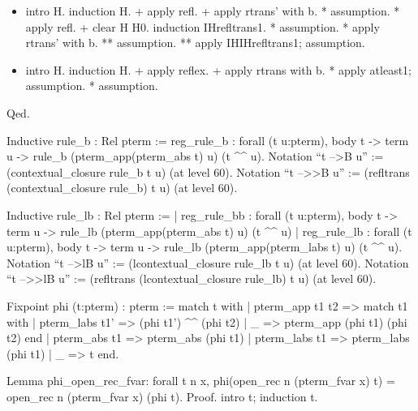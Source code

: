 \begin{itemize}
\item  intro H.
    induction H.
    + apply refl.
    + apply rtrans' with b.
      * assumption.
      * apply refl.
    + clear H H0.
      induction IHrefltrans1.
      * assumption.
      * apply rtrans' with b.
        ** assumption.
        ** apply IHIHrefltrans1; assumption.

\item  intro H.
    induction H.
    + apply reflex.
    + apply rtrans with b.
      * apply atleast1; assumption.
      * assumption.

\end{itemize}
Qed.    


Inductive rule\_b : Rel pterm  :=
  reg\_rule\_b : forall (t u:pterm), body t -> term u ->
    rule\_b (pterm\_app(pterm\_abs t) u) (t \^{}\^{} u).
Notation ``t -->B u'' := (contextual\_closure rule\_b t u) (at level 60).
Notation ``t -->>B u'' := (refltrans (contextual\_closure rule\_b) t u) (at level 60).


Inductive rule\_lb : Rel pterm  :=
  | reg\_rule\_bb : forall (t u:pterm), body t -> term u ->
    rule\_lb (pterm\_app(pterm\_abs t) u) (t \^{}\^{} u)
  | reg\_rule\_lb : forall (t u:pterm),
    body t -> term u ->
    rule\_lb (pterm\_app(pterm\_labs t) u) (t \^{}\^{} u).
Notation ``t -->lB u'' := (lcontextual\_closure rule\_lb t u) (at level 60).
Notation ``t -->>lB u'' := (refltrans (lcontextual\_closure rule\_lb) t u) (at level 60).


Fixpoint phi (t:pterm) : pterm :=
  match t with
  | pterm\_app t1 t2 => match t1 with
                      | pterm\_labs t1' => (phi t1') \^{}\^{} (phi t2)
                      | \_ => pterm\_app (phi t1) (phi t2)
                      end
  | pterm\_abs t1 => pterm\_abs (phi t1)
  | pterm\_labs t1 => pterm\_labs (phi t1)
  | \_ => t
  end.


Lemma phi\_open\_rec\_fvar: forall t n x, phi(open\_rec n (pterm\_fvar x) t) = open\_rec n (pterm\_fvar x) (phi t).
Proof.  
  intro t; induction t.

